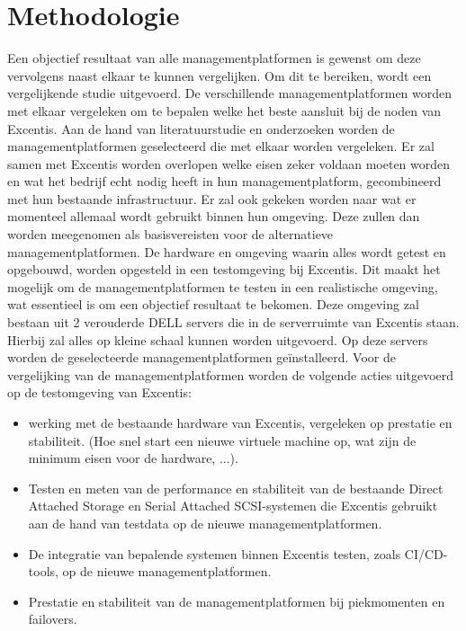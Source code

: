 

\section{Methodologie}%
\label{sec:methodologie}
Een objectief resultaat van alle managementplatformen is gewenst om deze vervolgens naast elkaar te kunnen vergelijken. Om dit te bereiken, wordt een vergelijkende studie uitgevoerd. De verschillende managementplatformen worden met elkaar vergeleken om te bepalen welke het beste aansluit bij de noden van Excentis.
Aan de hand van literatuurstudie en onderzoeken worden de managementplatformen geselecteerd die met elkaar worden vergeleken.
Er zal samen met Excentis worden overlopen welke eisen zeker voldaan moeten worden en wat het bedrijf echt nodig heeft in hun managementplatform, gecombineerd met hun bestaande infrastructuur. Er zal ook gekeken worden naar wat er momenteel allemaal wordt gebruikt binnen hun omgeving. Deze zullen dan worden meegenomen als basisvereisten voor de alternatieve managementplatformen.
De hardware en omgeving waarin alles wordt getest en opgebouwd, worden opgesteld in een testomgeving bij Excentis. Dit maakt het mogelijk om de managementplatformen te testen in een realistische omgeving, wat essentieel is om een objectief resultaat te bekomen.
Deze omgeving zal bestaan uit 2 verouderde DELL servers die in de serverruimte van Excentis staan. Hierbij zal alles op kleine schaal kunnen worden uitgevoerd.
Op deze servers worden de geselecteerde managementplatformen geïnstalleerd.
Voor de vergelijking van de managementplatformen worden de volgende acties uitgevoerd op de testomgeving van Excentis:
\begin{itemize}
\item werking met de bestaande hardware van Excentis, vergeleken op prestatie en stabiliteit. (Hoe snel start een nieuwe virtuele machine op, wat zijn de minimum eisen voor de hardware, ...).
\item Testen en meten van de performance en stabiliteit van de bestaande Direct Attached Storage en Serial Attached SCSI-systemen die Excentis gebruikt aan de hand van testdata op de nieuwe managementplatformen.
\item De integratie van bepalende systemen binnen Excentis testen, zoals CI/CD-tools, op de nieuwe managementplatformen.
\item Prestatie en stabiliteit van de managementplatformen bij piekmomenten en failovers.
\end{itemize}
